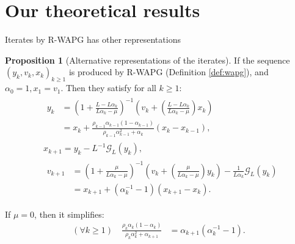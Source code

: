\documentclass[11pt]{beamer}
\theoremstyle{definition}
\newtheorem{proposition}{Proposition}[section]
\begin{document}
\section{Our theoretical results}
    \begin{frame}{Iterates by R-WAPG has other representations}
        \begin{proposition}[Alternative representations of the iterates]\label{prop:wapg-first-equivalent-repr}
            If the sequence $(y_k, v_k, x_k)_{k \ge 1}$ is produced by R-WAPG (Definition \ref{def:wapg}), and $\alpha_0 = 1, x_1 = v_1$. 
            Then they satisfy for all $k\ge 1$: 
            {\footnotesize
            \begin{align}
                & \begin{aligned}
                    y_{k} &=
                    \left(
                        1 + \frac{L - L\alpha_{k}}{L\alpha_{k} - \mu}
                    \right)^{-1}
                    \left(
                        v_{k} +
                        \left(\frac{L - L\alpha_{k}}{L\alpha_{k} - \mu} \right) x_{k}
                    \right)
                    \\
                    &= x_{k} +
                    \frac{\rho_{k - 1}\alpha_{k - 1}(1 - \alpha_{k - 1})}
                    {\rho_{k - 1}\alpha_{k - 1}^2 + \alpha_{k}}(x_{k} - x_{k - 1}), 
                \end{aligned}
                \\
                & x_{k + 1} =
                y_k - L^{-1} \mathcal G_L (y_k),
                \\
                & \begin{aligned}
                    v_{k + 1} 
                    &=
                    \left(
                        1 + \frac{\mu}{L \alpha_k - \mu}
                    \right)^{-1}
                    \left(
                        v_k +
                        \left(\frac{\mu}{L \alpha_k - \mu}\right) y_k
                    \right) - \frac{1}{L\alpha_{k}}\mathcal G_L (y_k)
                    \\
                    &= 
                    x_{k + 1} + (\alpha_k^{-1} - 1)(x_{k + 1} - x_k).
                \end{aligned}
            \end{align}
            }
        \end{proposition}
        If $\mu = 0$, then it simplifies:
        {\small
        \begin{align*}
            (\forall k \ge 1) \quad
            \frac{\rho_k\alpha_k(1 - \alpha_k)}{\rho_k\alpha_k^2 + \alpha_{k + 1}}
            & = \alpha_{k + 1}(\alpha_k^{-1} - 1).
        \end{align*}
        }
    \end{frame}
\end{document}
